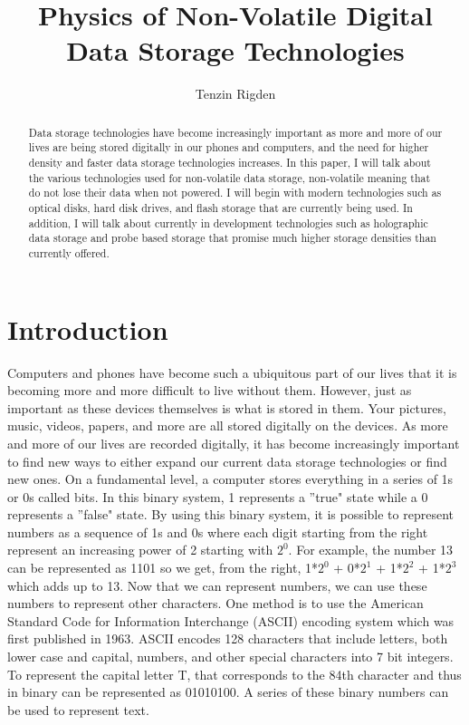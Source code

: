\documentclass[ notitlepage, numerical, 11pt]{revtex4-1} %
\begin{document}
\title{Physics of Non-Volatile Digital Data Storage Technologies}
\author{Tenzin Rigden}

\begin{abstract}
Data storage technologies have become increasingly important as more and more of our lives are being stored digitally in our phones and computers, and the need for higher density and faster data storage technologies increases. In this paper, I will talk about the various technologies used for non-volatile data storage, non-volatile meaning that do not lose their data when not powered. I will begin with modern technologies such as optical disks, hard disk drives, and flash storage that are currently being used. In addition, I will talk about currently in development technologies such as holographic data storage and probe based storage that promise much higher storage densities than currently offered. 
\end{abstract}

\maketitle
\section{Introduction}
Computers and phones have become such a ubiquitous part of our lives that it is becoming more and more difficult to live without them. However, just as important as these devices themselves is what is stored in them. Your pictures, music, videos, papers, and more are all stored digitally on the devices. As more and more of our lives are recorded digitally, it has become increasingly important to find new ways to either expand our current data storage technologies or find new ones. On a fundamental level, a computer stores everything in a series of 1s or 0s called bits. In this binary system, 1 represents a ''true" state while a 0 represents a ''false" state. By using this binary system, it is possible to represent numbers as a sequence of 1s and 0s where each digit starting from the right represent an increasing power of 2 starting with $2^0$. For example, the number 13 can be represented as 1101 so we get, from the right, 1*$2^0$ + 0*$2^1$ + 1*$2^2$ + 1*$2^3$ which adds up to 13. Now that we can represent numbers, we can use these numbers to represent other characters. One method is to use the American Standard Code for Information Interchange (ASCII) encoding system which was first published in 1963. ASCII encodes 128 characters that include letters, both lower case and capital, numbers, and other special characters into 7 bit integers. To represent the capital letter T, that corresponds to the 84th character and thus in binary can be represented as 01010100. A series of these binary numbers can be used to represent text.
\end{document}
